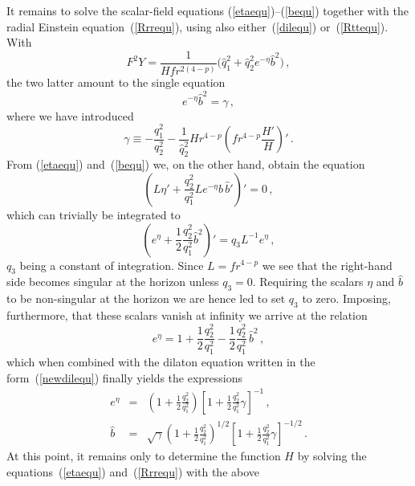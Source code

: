 \documentclass[a4paper,11pt]{article}
\newcommand{\qh}{\hat{q}} \newcommand{\hh}{\hat{h}}
\newcommand{\eqref}[1]{(\ref{#1})}
\begin{document}
It remains to solve the scalar-field equations
\eqref{etaequ}--\eqref{bequ} together with the radial Einstein
equation~\eqref{Rrrequ}, using also either~\eqref{dilequ}
or~\eqref{Rttequ}. With
%
\begin{equation}
\label{F2Yp}
F^2 Y = \frac{1}{H f r^{2(4-p)}} \Big( \qh_1^2+\qh_2^2 e^{-\eta}
\hat{b}^2 \Big)\,,
\end{equation}
%
the two latter amount to the single equation
%
\begin{equation}
\label{newdilequ} e^{-\eta} \hat{b}^2 = \gamma \,,
\end{equation}
%
where we have introduced
%
\begin{equation}
\gamma \equiv -\frac{q_1^2}{q_2^2} - \frac{1}{\qh_2^2} H r^{4-p}
\left( f r^{4-p} \frac{H'}{H} \right)' \,.
\end{equation}
%
From \eqref{etaequ} and~\eqref{bequ} we, on the other hand, obtain the
equation
%
\begin{equation}
\left( L \eta' + \frac{q_2^2}{q_1^2} L e^{-\eta} \hat{b} \, \hat{b}'
\right)' = 0 \,,
\end{equation}
%
which can trivially be integrated to
%
\begin{equation}
\label{q3eq} \left( e^\eta + \frac{1}{2} \frac{q_2^2}{q_1^2}
\hat{b}^2 \right)' = q_3 L^{-1} e^\eta \,,
\end{equation}
%
$q_3$ being a constant of integration. Since $L = f r^{4-p}$ we see
that the right-hand side becomes singular at the horizon unless
$q_3=0$. Requiring the scalars $\eta$ and $\hat{b}$ to be non-singular
at the horizon we are hence led to set $q_3$ to zero. Imposing,
furthermore, that these scalars vanish at infinity we arrive at the
relation
%
\begin{equation}
e^\eta = 1 + \frac{1}{2} \frac{q_2^2}{q_1^2} - \frac{1}{2}
\frac{q_2^2}{q_1^2}\, \hat{b}^2 \,,
\end{equation}
%
which when combined with the dilaton equation written in the
form~\eqref{newdilequ} finally yields the expressions
%
\begin{eqnarray}
e^{\eta} &=& \left( 1 + \frac{1}{2} \frac{q_2^2}{q_1^2} \right) \left[
1 + \frac{1}{2} \frac{q_2^2}{q_1^2} \gamma \right]^{-1} \,, \\[2ex]
%
\hat{b} &=& \sqrt{\gamma} \left( 1 + \frac{1}{2} \frac{q_2^2}{q_1^2}
\right)^{1/2} \left[ 1 + \frac{1}{2} \frac{q_2^2}{q_1^2} \gamma
\right]^{-1/2} \,.
\end{eqnarray}
%
At this point, it remains only to determine the function $H$ by
solving the equations~\eqref{etaequ} and~\eqref{Rrrequ} with the above
\end{document}
